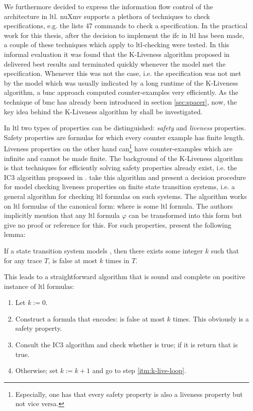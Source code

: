 We furthermore decided to express the information flow control of the architecture in \gls{ltl}.
nuXmv supports a plethora of techniques to check specifications, e.g. the  \cite{nuXmv} lists 47 commands to check a specification.
In the practical work for this thesis, after the decision to implement the \gls{ifc} in \gls{ltl} has been made, a couple of these techniques which apply to \gls{ltl}-checking were tested.
In this informal evaluation it was found that the K-Liveness algorithm proposed in \cite{Claessen12} delivered best results and terminated quickly whenever the model met the specification.
Whenever this was not the case, i.e. the specification was not met by the model which was usually indicated by a long runtime of the K-Liveness algorithm, a \gls{bmc} approach computed counter-examples very efficiently.
As the technique of \gls{bmc} has already been introduced in section \ref{sec:spacer}, now, the key idea behind the K-Liveness algorithm by \citeauthor{Claessen12} shall be investigated.

In \gls{ltl} two types of properties can be distinguished: \textit{safety} and \textit{liveness} properties.
Safety properties are formulas for which every counter example has finite length.
Liveness properties on the other hand can\footnote{%
    Especially, one has that every safety property is also a liveness property but not vice versa.
} have counter-examples which are infinite and cannot be made finite.
The background of the K-Liveness algorithm is that techniques for efficiently solving safety properties already exist, i.e. the IC3 algorithm proposed in \cite{Bradley11}.
\citeauthor{Claessen12} take this algorithm and present a decision procedure for model checking liveness properties on finite state transition systems, i.e. a general algorithm for checking \gls{ltl} formulas on such systems.
The algorithm works on \gls{ltl} formulas of the canonical form:  where  is some \gls{ltl} formula.
The authors implicitly mention that any \gls{ltl} formula $ \varphi $ can be transformed into this form but give no proof or reference for this.
For such properties, \citeauthor{Claessen12} present the following lemma:
\begin{lemma}
    If a state transition system models , then there exists some integer $ k $ such that for any trace $ T $,  is false at most $ k $ times in $ T $.
\end{lemma}
This leads to a straightforward algorithm that is sound and complete on positive instance of \gls{ltl} formulas:
\begin{enumerate}
    \item Let $ k := 0 $.
    \item Construct a formula  that encodes:  is false at most $ k $ times. \label{itm:k-live-loop}
    This obviously is a safety property.
    \item Consult the IC3 algorithm and check whether  is true; if it is return that  is true.
    \item Otherwise; set $ k := k + 1 $ and go to step \ref{itm:k-live-loop}.
\end{enumerate}

